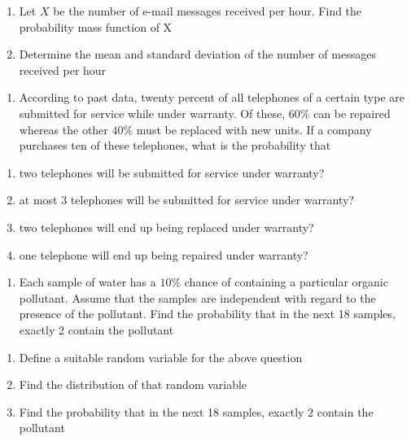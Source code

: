 \documentclass[]{book}
\providecommand{\tightlist}{%
  \setlength{\itemsep}{0pt}\setlength{\parskip}{0pt}}
\begin{document}
\begin{enumerate}
\def\labelenumi{\alph{enumi})}
\tightlist
\item
  Let \(X\) be the number of e-mail messages received per hour. Find the probability mass function of X
\item
  Determine the mean and standard deviation of the number of messages received per hour
\end{enumerate}

\begin{enumerate}
\def\labelenumi{\arabic{enumi}.}
\setcounter{enumi}{7}
\tightlist
\item
  According to past data, twenty percent of all telephones of a certain type are submitted for service while under warranty. Of these, \(60\%\) can be repaired whereas the other \(40\%\) must be replaced with new units. If a company purchases ten of these telephones, what is the probability that
\end{enumerate}

\begin{enumerate}
\def\labelenumi{\alph{enumi})}
\tightlist
\item
  two telephones will be submitted for service under warranty?
\item
  at most 3 telephones will be submitted for service under warranty?
\item
  two telephones will end up being replaced under warranty?
\item
  one telephone will end up being repaired under warranty?
\end{enumerate}

\begin{enumerate}
\def\labelenumi{\arabic{enumi}.}
\setcounter{enumi}{8}
\tightlist
\item
  Each sample of water has a \(10\%\) chance of containing a particular organic pollutant. Assume that the samples are independent with regard to the presence of the pollutant. Find the probability that in the next 18 samples, exactly 2 contain the pollutant
\end{enumerate}

\begin{enumerate}
\def\labelenumi{\alph{enumi})}
\tightlist
\item
  Define a suitable random variable for the above question
\item
  Find the distribution of that random variable
\item
  Find the probability that in the next 18 samples, exactly 2 contain the pollutant
\end{enumerate}
\end{document}
